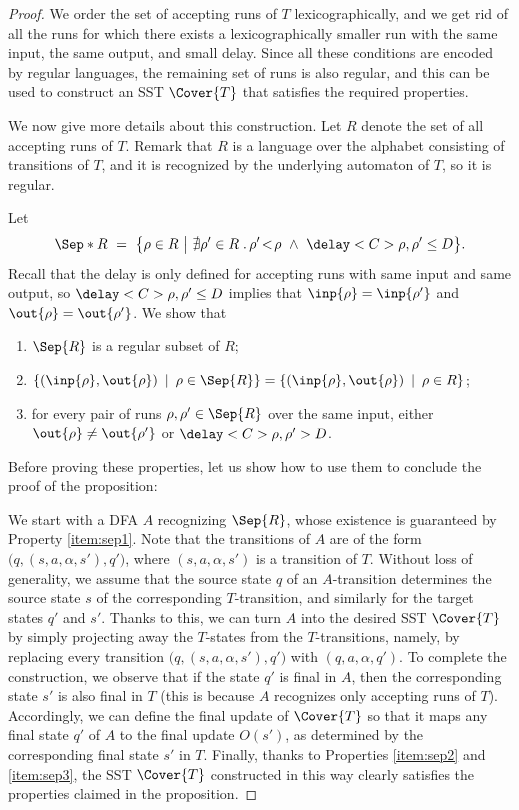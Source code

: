 \documentclass{article}
\providecommand{\AP}{}\NewDocumentCommand{\reintro}{o m}{#2}
\newcommand{\finalupd}{O}
\begin{document}
\begin{proof}
We order the set of accepting runs of $T$ lexicographically,
and we get rid of all the runs for which there exists a 
lexicographically smaller run with the same input, 
the same output, and small delay. 
Since all these conditions are encoded by regular languages, 
the remaining set of runs is also regular, and this can be 
used to construct an SST $\Cover{T}$ that satisfies the 
required properties.

We now give more details about this construction. 
Let $R$ denote the set of all accepting runs of $T$.
Remark that $R$ is a language over the alphabet consisting 
of transitions of $T$, and it is recognized by the underlying 
automaton of $T$, so it is regular.
\AP
Let
\[
    \Sep*{R}
    ~=~
        \big\{  \rho \in R
                ~\big|~
			    \nexists \rho' \in R \; .\,
			    \rho' \!<\! \rho ~\wedge~ \delay<C>{\rho,\rho'} \leq D
        \big\}.
\]
Recall that the delay is only defined for accepting runs 
with same input and same output, 
so $\delay<C>{\rho,\rho'} \leq D$ implies that $\inp{\rho} = \inp{\rho'}$ 
and $\out{\rho} = \out{\rho'}$.
We show that
\begin{enumerate}[label={\sc\alph*)}]
    \item \label{item:sep1}
          $\Sep{R}$ is a regular subset of $R$;
    \item \label{item:sep2}
          $\{(\inp{\rho}, \out{\rho}) \:\mid\: \rho \in \Sep{R}\} = \{(\inp{\rho}, \out{\rho}) \:\mid\: \rho \in R\}$;
    \item \label{item:sep3}
          for every pair of runs $\rho, \rho' \in \Sep{R}$ over the same input,
          either $\out{\rho} \neq \out{\rho'}$ or $\delay<C>{\rho,\rho'} > D$.
\end{enumerate}
Before proving these properties, let us show how to use them to conclude the 
proof of the proposition:

We start with a DFA $A$ recognizing $\Sep{R}$, whose existence is guaranteed by 
Property \ref{item:sep1}. Note that the transitions of $A$ are of the form
$\big(q,(s,a,\alpha,s'),q'\big)$, where $(s,a,\alpha,s')$ is a transition of $T$.
Without loss of generality, we assume that the source state $q$ 
of an $A$-transition determines the source state $s$ 
of the corresponding $T$-transition, and similarly
for the target states $q'$ and $s'$.
Thanks to this, we can turn $A$ into the desired SST $\Cover{T}$
by simply projecting away 
the $T$-states from the $T$-transitions, namely, by replacing every transition
$\big(q,(s,a,\alpha,s'),q'\big)$ with $(q,a,\alpha,q')$. 
To complete the construction, we observe that if the state $q'$
is final in $A$, then the corresponding state $s'$ is also final in $T$
(this is because $A$ recognizes only accepting runs of $T$). 
Accordingly, we can define the final update of $\Cover{T}$
so that it maps any final state $q'$ of $A$ to the 
final update $\finalupd(s')$, as determined by the corresponding
final state $s'$ in $T$.
Finally, thanks to Properties \ref{item:sep2} and \ref{item:sep3}, 
the SST $\Cover{T}$ constructed in this way clearly satisfies the 
properties claimed in the proposition.


\end{proof}
\end{document}
